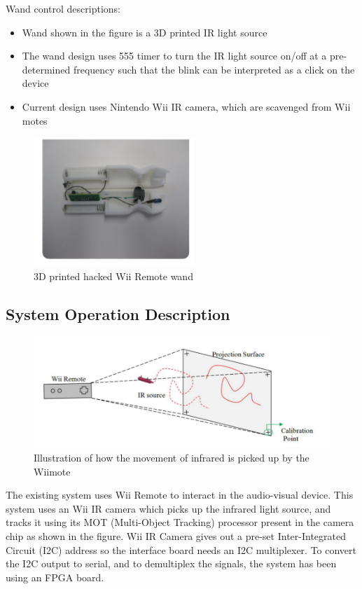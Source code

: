 \documentclass[12pt, a4paper]{article}
\begin{document}
\newpage

Wand control descriptions:
\begin{itemize}
\item Wand shown in the figure is a 3D printed IR light source
\item The wand design uses 555 timer to turn the IR light source on/off at a pre-determined frequency such that the blink can be interpreted as a click on the device
\item Current design uses Nintendo Wii IR camera, which are scavenged from Wii motes
\end{itemize}

\begin{figure}[hb]
\centering
\includegraphics[width=2.4in]{wand1}
\caption{3D printed hacked Wii Remote wand}
\label{}
\end{figure}

\subsection{System Operation Description}
\begin{figure}[htp]
\centering
\includegraphics[scale=0.35]{wiiiii.png}
\caption{Illustration of how the movement of infrared is picked up by the Wiimote}
\label{}
\end{figure}

The existing system uses Wii Remote to interact in the audio-visual device. This system uses an Wii IR camera which picks up the infrared light source, and tracks it using its MOT (Multi-Object Tracking) processor present in the camera chip as shown in the figure. Wii IR Camera gives out a pre-set Inter-Integrated Circuit (I2C) address so the interface board needs an I2C multiplexer. To convert the I2C output to serial, and to demultiplex the signals, the system has been using an FPGA board. 
\end{document}
